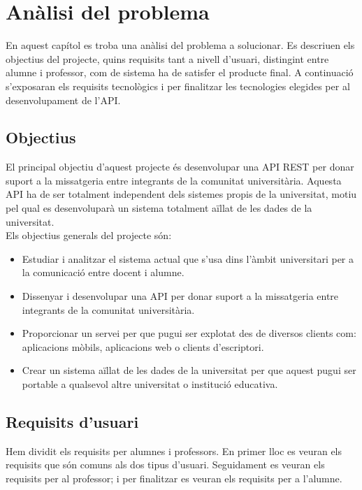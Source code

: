 
\chapter{Anàlisi del problema}\label{analisi}
En aquest capítol es troba una anàlisi del problema a solucionar. Es descriuen els objectius del projecte, quins requisits tant a nivell d'usuari, distingint entre alumne i professor, com de sistema ha de satisfer el producte final. A continuació s'exposaran els requisits tecnològics i per finalitzar les tecnologies elegides per al desenvolupament de l'\ac{API}.

\section{Objectius} \label{objectius}

El principal objectiu d'aquest projecte és desenvolupar una \ac{API} \ac{REST} per donar suport a la missatgeria entre integrants de la comunitat universitària. Aquesta \ac{API} ha de ser totalment independent dels sistemes propis de la universitat, motiu pel qual es desenvoluparà un sistema totalment aïllat de les dades de la universitat. \\

Els objectius generals del projecte són:
\begin{itemize}
	\item Estudiar i analitzar el sistema actual que s'usa dins l'àmbit universitari per a la comunicació entre docent i alumne.
	\item Dissenyar i desenvolupar una \ac{API} per donar suport a la missatgeria entre integrants de la comunitat universitària.
	\item Proporcionar un servei per que pugui ser explotat des de diversos clients com: aplicacions mòbils, aplicacions web o clients d'escriptori.
	\item Crear un sistema aïllat de les dades de la universitat per que aquest pugui ser portable a qualsevol altre universitat o institució educativa.
\end{itemize}
\section{Requisits d'usuari}
Hem dividit els requisits per alumnes i professors. En primer lloc es veuran els requisits que són comuns als dos tipus d'usuari. Seguidament es veuran els requisits per al professor; i per finalitzar es veuran els requisits per a l'alumne.

